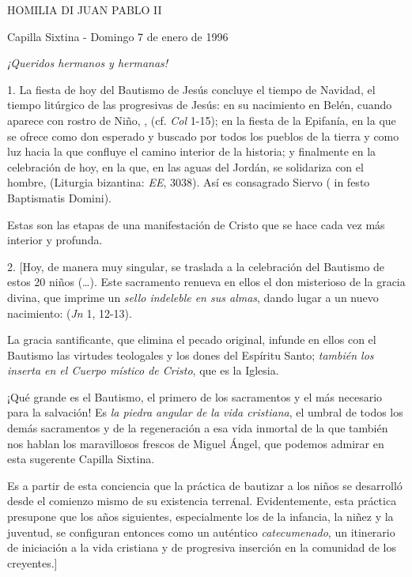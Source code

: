 \begin{body}
	HOMILIA DI JUAN PABLO II

	Capilla Sixtina - Domingo 7 de enero de 1996

	\emph{¡Queridos hermanos y hermanas!}

	1. La fiesta de hoy del Bautismo de Jesús concluye el tiempo de Navidad, el tiempo litúrgico de las progresivas  de Jesús: en su nacimiento en Belén, cuando aparece con rostro de Niño, ,  (cf. \emph{Col} 1-15); en la fiesta de la Epifanía, en la que se ofrece como don esperado y buscado por todos los pueblos de la tierra y como luz hacia la que confluye el camino interior de la historia; y finalmente en la celebración de hoy, en la que, en las aguas del Jordán, se solidariza con el hombre,  (Liturgia bizantina: \emph{EE}, 3038). Así es consagrado Siervo  ( in festo Baptismatis Domini).

	Estas son las etapas de una manifestación de Cristo que se hace cada vez más interior y profunda.

	2. {[}Hoy, de manera muy singular, se traslada a la celebración del Bautismo de estos 20 niños (\ldots{}). Este sacramento renueva en ellos el don misterioso de la gracia divina, que imprime un \emph{sello indeleble en sus almas}, dando lugar a un nuevo nacimiento:  (\emph{Jn} 1, 12-13).

	La gracia santificante, que elimina el pecado original, infunde en ellos con el Bautismo las virtudes teologales y los dones del Espíritu Santo; \emph{también los inserta en el Cuerpo místico de Cristo}, que es la Iglesia.

	¡Qué grande es el Bautismo, el primero de los sacramentos y el más necesario para la salvación! Es \emph{la piedra angular de la vida cristiana}, el umbral de todos los demás sacramentos y de la regeneración a esa vida inmortal de la que también nos hablan los maravillosos frescos de Miguel Ángel, que podemos admirar en esta sugerente Capilla Sixtina.

	Es a partir de esta conciencia que la práctica de bautizar a los niños se desarrolló desde el comienzo mismo de su existencia terrenal. Evidentemente, esta práctica presupone que los años siguientes, especialmente los de la infancia, la niñez y la juventud, se configuran entonces como un auténtico \emph{catecumenado}, un itinerario de iniciación a la vida cristiana y de progresiva inserción en la comunidad de los creyentes.{]}


\end{body}
